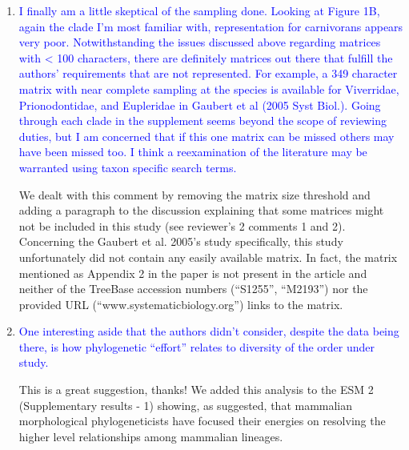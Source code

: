 \documentclass[12pt,letterpaper]{article}
\begin{document}
\begin{enumerate}
\item{\textcolor{blue}{I finally am a little skeptical of the sampling done. Looking at Figure 1B, again the clade I'm most familiar with, representation for carnivorans appears very poor. Notwithstanding the issues discussed above regarding matrices with < 100 characters, there are definitely matrices out there that fulfill the authors' requirements that are not represented. For example, a 349 character matrix with near complete sampling at the species is available for Viverridae, Prionodontidae, and Eupleridae in Gaubert et al (2005 Syst Biol.). Going through each clade in the supplement seems beyond the scope of reviewing duties, but I am concerned that if this one matrix can be missed others may have been missed too. I think a reexamination of the literature may be warranted using taxon specific search terms.}}

We dealt with this comment by removing the matrix size threshold and adding a paragraph to the discussion explaining that some matrices might not be included in this study (see reviewer's 2 comments 1 and 2).
Concerning the Gaubert et al. 2005's study specifically, this study unfortunately did not contain any easily available matrix.
In fact, the matrix mentioned as Appendix 2 in the paper is not present in the article and neither of the TreeBase accession numbers (``S1255'', ``M2193'') nor the provided URL (``www.systematicbiology.org'') links to the matrix.

\item{\textcolor{blue}{One interesting aside that the authors didn't consider, despite the data being there, is how phylogenetic ``effort'' relates to diversity of the order under study.}}

This is a great suggestion, thanks!
We added this analysis to the ESM 2 (Supplementary results - 1) showing, as suggested, that mammalian morphological phylogeneticists have focused their energies on resolving the higher level relationships among mammalian lineages.


\end{enumerate}
\end{document}

